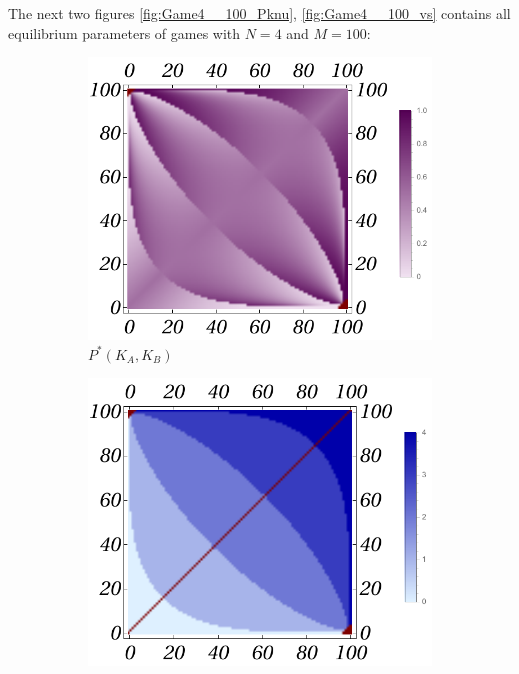 \documentclass{article}
\theoremstyle{definition}
\begin{document}
The next two figures \ref{fig:Game4__100_Pknu}, \ref{fig:Game4__100_vs} contains all equilibrium parameters of games with $N=4$ and $M=100$:


\begin{figure}[H]
    \centering
    \begin{subfigure}[b]{0.3\textwidth}
        \includegraphics[width=\textwidth]{img/P_Plot_4_100.pdf}
        \caption{$P^*(K_A,K_B)$}
        \label{fig:Game4__100_P}
    \end{subfigure}
    \hfill %
    \begin{subfigure}[b]{0.3\textwidth}
        \includegraphics[width=\textwidth]{img/k_Plot_4_100.pdf}

\end{subfigure}
\end{figure}
\end{document}
